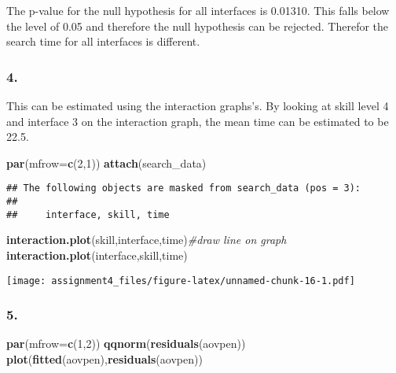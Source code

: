 \documentclass[11pt,]{article}
\newenvironment{Shaded}{\begin{snugshade}}{\end{snugshade}}
\newcommand{\KeywordTok}[1]{\textcolor[rgb]{0.13,0.29,0.53}{\textbf{{#1}}}}
\newcommand{\DataTypeTok}[1]{\textcolor[rgb]{0.13,0.29,0.53}{{#1}}}
\newcommand{\DecValTok}[1]{\textcolor[rgb]{0.00,0.00,0.81}{{#1}}}
\newcommand{\CommentTok}[1]{\textcolor[rgb]{0.56,0.35,0.01}{\textit{{#1}}}}
\newcommand{\NormalTok}[1]{{#1}}
\begin{document}
The p-value for the null hypothesis for all interfaces is 0.01310. This
falls below the level of 0.05 and therefore the null hypothesis can be
rejected. Therefor the search time for all interfaces is different.

\subsubsection{4.}\label{section-8}

This can be estimated using the interaction graphs's. By looking at
skill level 4 and interface 3 on the interaction graph, the mean time
can be estimated to be 22.5.

\begin{Shaded}
\begin{Highlighting}[]
\KeywordTok{par}\NormalTok{(}\DataTypeTok{mfrow=}\KeywordTok{c}\NormalTok{(}\DecValTok{2}\NormalTok{,}\DecValTok{1}\NormalTok{))}
\KeywordTok{attach}\NormalTok{(search_data)}
\end{Highlighting}
\end{Shaded}

\begin{verbatim}
## The following objects are masked from search_data (pos = 3):
## 
##     interface, skill, time
\end{verbatim}

\begin{Shaded}
\begin{Highlighting}[]
\KeywordTok{interaction.plot}\NormalTok{(skill,interface,time)}\CommentTok{#draw line on graph}
\KeywordTok{interaction.plot}\NormalTok{(interface,skill,time) }
\end{Highlighting}
\end{Shaded}

\texttt{[image: assignment4\_files/figure-latex/unnamed-chunk-16-1.pdf]}

\subsubsection{5.}\label{section-9}

\begin{Shaded}
\begin{Highlighting}[]
\KeywordTok{par}\NormalTok{(}\DataTypeTok{mfrow=}\KeywordTok{c}\NormalTok{(}\DecValTok{1}\NormalTok{,}\DecValTok{2}\NormalTok{))}
\KeywordTok{qqnorm}\NormalTok{(}\KeywordTok{residuals}\NormalTok{(aovpen))}
\KeywordTok{plot}\NormalTok{(}\KeywordTok{fitted}\NormalTok{(aovpen),}\KeywordTok{residuals}\NormalTok{(aovpen))}
\end{Highlighting}
\end{Shaded}
\end{document}
